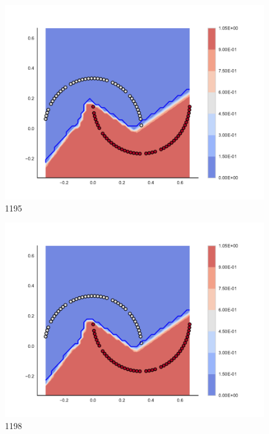 \begin{subfigure}[b]{0.09\textwidth}
    \includegraphics[clip, trim=2.35cm 1.75cm 4.5cm 0cm,width=\textwidth]{img/convergence/1195.pdf}
    \caption{1195}
    \label{fig:convergence_1195}
\end{subfigure}
%
\begin{subfigure}[b]{0.09\textwidth}
    \includegraphics[clip, trim=2.35cm 1.75cm 4.5cm 0cm,width=\textwidth]{img/convergence/1198.pdf}
    \caption{1198}
    \label{fig:convergence_1198}
\end{subfigure}
%
